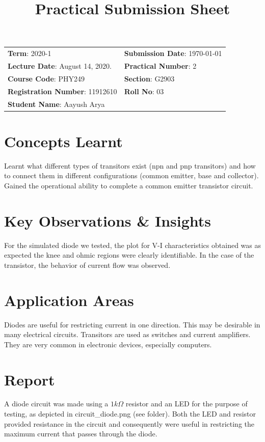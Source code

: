 \documentclass{article}
\title{Practical Submission Sheet}
\date{}
\newcommand{\bb}[1]{\textbf{#1}}
\begin{document}
	\maketitle
	\begin{tabular}{ll}
		\bb{Term}: 2020-1 & \bb{Submission Date}: \today\\
		\bb{Lecture Date}: August 14, 2020. & \bb{Practical Number}: 2\\
		\bb{Course Code}: PHY249 & \bb{Section}: G2903\\
		\bb{Registration Number}: 11912610 & \bb{Roll No}: 03\\
		\bb{Student Name}: Aayush Arya & \\
	\end{tabular}
	
	\section*{Concepts Learnt}
	Learnt what different types of transitors exist (npn and pnp transitors) and how to connect them in different configurations (common emitter, base and collector). Gained the operational ability to complete a common emitter transistor circuit. 
	\section*{Key Observations \& Insights}
	For the simulated diode we tested, the plot for V-I characteristics obtained was as expected \textemdash the knee and ohmic regions were clearly identifiable. In the case of the transistor, the behavior of current flow was observed.
	\section*{Application Areas}
	Diodes are useful for restricting current in one direction. This may be desirable in many electrical circuits. Transitors are used as switches and current amplifiers. They are very common in electronic devices, especially computers.
	\section*{Report}
	A diode circuit was made using a $1k\Omega$ resistor and an LED for the purpose of testing, as depicted in circuit\_diode.png (see folder). Both the LED and resistor provided resistance in the circuit and consequently were useful in restricting the maximum current that passes through the diode.
	
\end{document}
